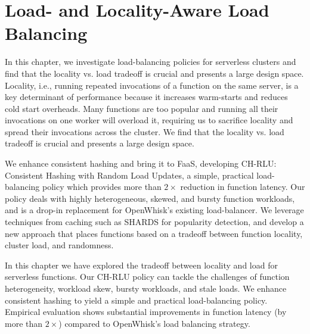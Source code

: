 \chapter{Load- and Locality-Aware Load Balancing}
\label{chap:chrlu}

In this chapter, we investigate load-balancing policies for serverless clusters and find that the locality vs. load tradeoff is crucial and presents a large design space.
Locality, i.e., running repeated invocations of a function on the same server, is a key determinant of performance because it increases warm-starts and reduces cold start overheads.
Many functions are too popular and running all their invocations on one worker will overload it, requiring us to sacrifice locality and spread their invocations across the cluster.
We find that the locality vs. load tradeoff is crucial and presents a large design space. 

We enhance consistent hashing and bring it to FaaS, developing CH-RLU: Consistent Hashing with Random Load Updates, a simple, practical load-balancing policy which provides more than $2\times$ reduction in function latency. 
Our policy deals with highly heterogeneous, skewed, and bursty function workloads, and is a drop-in replacement for OpenWhisk's existing load-balancer.
We leverage techniques from caching such as SHARDS for popularity detection, and develop a new approach that places functions based on a tradeoff between function locality, cluster load, and randomness. 













In this chapter we have explored the tradeoff between locality and load for serverless functions. 
Our CH-RLU policy can tackle the challenges of function heterogeneity, workload skew, bursty workloads, and stale loads.
We enhance consistent hashing to yield a simple and practical load-balancing policy. 
Empirical evaluation shows substantial improvements in function latency (by more than $2\times$) compared to OpenWhisk's load balancing strategy.


